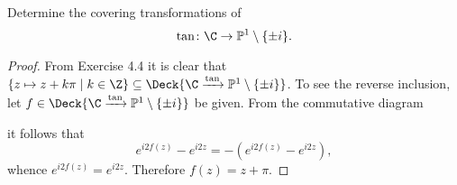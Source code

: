 \documentclass[10pt]{amsart}
\begin{document}
\begin{thm}
  Determine the covering transformations of
  $$\tan \colon \C \rightarrow \mathbb{P}^1 \setminus \{\pm i\}.$$
  
  \begin{proof}
    From Exercise 4.4 it is clear that $\left\{ z \mapsto z + k\pi \;\middle\vert\; k \in \Z \right\} \subseteq \Deck{\C \xrightarrow{\tan} \mathbb{P}^1 \setminus \{\pm i\}}$.
    To see the reverse inclusion, let $f \in \Deck{\C \xrightarrow{\tan} \mathbb{P}^1 \setminus \{\pm i\}}$ be given.
    From the commutative diagram
    \begin{center}
    \end{center}
    it follows that
    $$e^{i2f(z)} - e^{i2z} = -(e^{i2f(z)} - e^{i2z}),$$
    whence $e^{i2f(z)} = e^{i2z}$.
    Therefore $f(z) = z + \pi$.
  \end{proof}
\end{thm}
\end{document}
